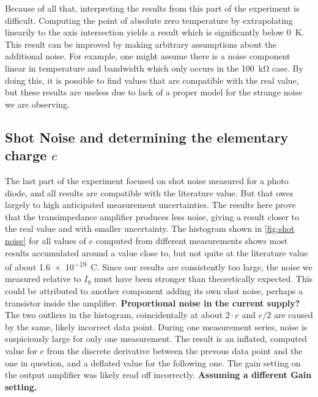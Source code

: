 \documentclass[
    parskip=half, 
    twoside=false,
    twocolumn=true,
    fontsize=11pt,
]{scrarticle}
\begin{document}
Because of all that, interpreting the results from this part of the experiment is difficult. Computing the point of absolute zero temperature by extrapolating linearily to the axis intersection yields a result which is significantly below \SI{0}{\kelvin}. This result can be improved by making arbitrary assumptions about the additional noise. For example, one might assume there is a noise component linear in temperature and bandwidth which only occurs in the \SI{100}{\kilo\ohm} case. By doing this, it is possible to find values that are compatible with the real value, but these results are useless due to lack of a proper model for the strange noise we are observing.

\subsection{Shot Noise and determining the elementary charge $e$}

The last part of the experiment focused on shot noise measured for a photo diode, and all results are compatible with the literature value. But that owes largely to high anticipated measurement uncertainties. The results here prove that the transimpedance amplifier produces less noise, giving a result closer to the real value and with smaller uncertainty. The histogram shown in \autoref{fig:shot noise} for all values of $e$ computed from different measurements shows most results accumulated around a value close to, but not quite at the literature value of about \SI{1.6e-19}{\coulomb}. Since our results are consistently too large, the noise we measured relative to $I_0$ must have been stronger than theoretically expected. 
This could be attributed to another component adding its own shot noise, perhaps a transistor inside the amplifier. 
\textbf{Proportional noise in the current supply?}\\
The two outliers in the histogram, coincidentally at about $2 \cdot e$ and $e/2$ are caused by the same, likely incorrect data point. During one measurement series, noise is suspiciously large for only one measurement. The result is an inflated, computed value for $e$ from the discrete derivative between the prevous data point and the one in question, and a deflated value for the following one. The gain setting on the output amplifier was likely read off incorrectly.
\textbf{Assuming a different Gain setting.}

\pagebreak
\end{document}
